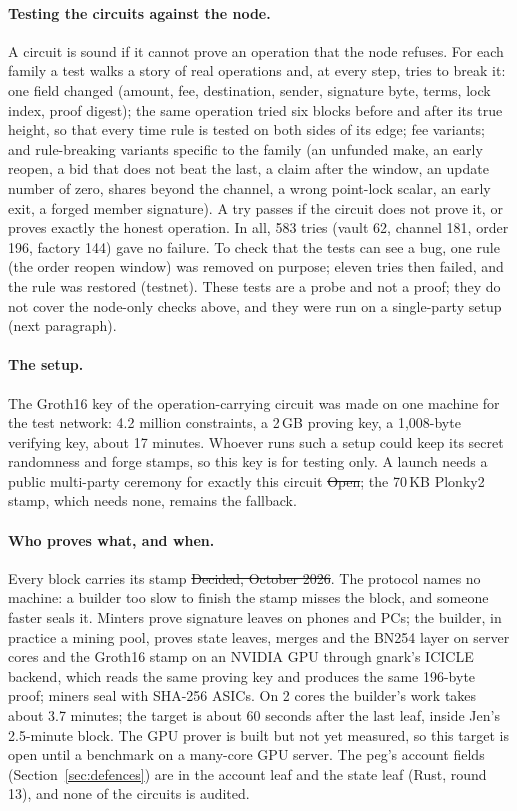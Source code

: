\paragraph{Testing the circuits against the node.} A circuit is sound if it cannot prove an operation that the node refuses. For each family a test walks a story of real operations and, at every step, tries to break it: one field changed (amount, fee, destination, sender, signature byte, terms, lock index, proof digest); the same operation tried six blocks before and after its true height, so that every time rule is tested on both sides of its edge; fee variants; and rule-breaking variants specific to the family (an unfunded make, an early reopen, a bid that does not beat the last, a claim after the window, an update number of zero, shares beyond the channel, a wrong point-lock scalar, an early exit, a forged member signature). A try passes if the circuit does not prove it, or proves exactly the honest operation. In all, 583 tries (vault 62, channel 181, order 196, factory 144) gave no failure. To check that the tests can see a bug, one rule (the order reopen window) was removed on purpose; eleven tries then failed, and the rule was restored (testnet). These tests are a probe and not a proof; they do not cover the node-only checks above, and they were run on a single-party setup (next paragraph).

\paragraph{The setup.} The Groth16 key of the operation-carrying circuit was made on one machine for the test network: 4.2 million constraints, a 2\,GB proving key, a 1,008-byte verifying key, about 17 minutes. Whoever runs such a setup could keep its secret randomness and forge stamps, so this key is for testing only. A launch needs a public multi-party ceremony for exactly this circuit \st{Open}; the 70\,KB Plonky2 stamp, which needs none, remains the fallback.

\paragraph{Who proves what, and when.} Every block carries its stamp \st{Decided, October 2026}. The protocol names no machine: a builder too slow to finish the stamp misses the block, and someone faster seals it. Minters prove signature leaves on phones and PCs; the builder, in practice a mining pool, proves state leaves, merges and the BN254 layer on server cores and the Groth16 stamp on an NVIDIA GPU through gnark's ICICLE backend, which reads the same proving key and produces the same 196-byte proof; miners seal with SHA-256 ASICs. On 2 cores the builder's work takes about 3.7 minutes; the target is about 60 seconds after the last leaf, inside Jen's 2.5-minute block. The GPU prover is built but not yet measured, so this target is open until a benchmark on a many-core GPU server. The peg's account fields (Section~\ref{sec:defences}) are in the account leaf and the state leaf (Rust, round 13), and none of the circuits is audited.

